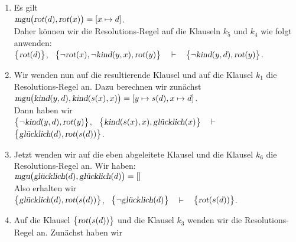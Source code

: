 \begin{enumerate}
\item Es gilt 
      \\[0.2cm]
      \hspace*{1.3cm}
      $\textsl{mgu}\bigl(\textsl{rot}(d), \textsl{rot}(x)\bigr) = [x \mapsto d]$.
      \\[0.2cm]
      Daher k\"{o}nnen wir die Resolutions-Regel auf die Klauseln $k_5$ und $k_4$ wie folgt anwenden:
      \\[0.2cm]
      \hspace*{1.3cm}
      $\bigl\{\textsl{rot}(d)\bigl\}$, \ $\bigl\{\neg \textsl{rot}(x), \neg \textsl{kind}(y,x),
       \textsl{rot}(y)\bigl\}$ \ $\vdash$ \ $\bigl\{\neg \textsl{kind}(y,d), \textsl{rot}(y)\bigl\}$.
\item Wir wenden nun auf die resultierende Klausel und auf die Klausel $k_1$ die
      Resolutions-Regel an.  Dazu berechnen wir zun\"{a}chst
      \\[0.2cm]
      \hspace*{1.3cm}
      $\textsl{mgu}\bigl(\textsl{kind}(y,d), \textsl{kind}(s(x),x)\bigr) = 
       [y \mapsto s(d), x \mapsto d]$.
      \\[0.2cm]
      Dann haben wir
      \\[0.2cm]
      \hspace*{1.3cm}
       $\bigl\{\neg \textsl{kind}(y,d), \textsl{rot}(y)\bigl\}$, \ 
       $\bigl\{\textsl{kind}(s(x),x), \textsl{gl\"{u}cklich}(x)\bigl\}$ \ $\vdash$ \ 
       $\bigl\{\textsl{gl\"{u}cklich}(d), \textsl{rot}(s(d))\bigl\}$.
\item Jetzt wenden wir auf die eben abgeleitete Klausel und die Klausel $k_6$ die
      Resolutions-Regel an.  Wir haben:
      \\[0.2cm]
      \hspace*{1.3cm}
      $\textsl{mgu}\bigl(\textsl{gl\"{u}cklich}(d), \textsl{gl\"{u}cklich}(d)\bigr) = []$
      \\[0.2cm]
      Also erhalten wir
      \\[0.2cm]
      \hspace*{1.3cm}
      $\bigl\{\textsl{gl\"{u}cklich}(d), \textsl{rot}(s(d))\bigl\}$, \ $\bigl\{\neg \textsl{gl\"{u}cklich}(d)\bigl\}$ \ $\vdash$ \ $\bigl\{\textsl{rot}(s(d))\bigl\}$.
\item Auf die Klausel $\bigl\{\textsl{rot}(s(d))\bigl\}$ und die Klausel $k_3$ wenden wir
      die Resolutions-Regel an.  Zun\"{a}chst haben wir
      \\[0.2cm]
      \hspace*{1.3cm}

\end{enumerate}
